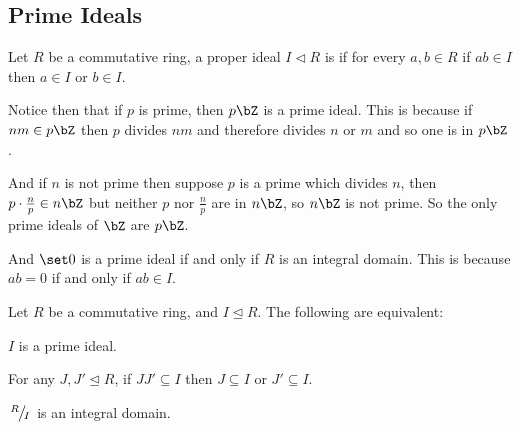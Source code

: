 \documentclass[10pt]{article}
\let\ideal=\trianglelefteq
\let\pideal=\triangleleft
\begin{document}


\bigskip

\subsection{Prime Ideals}

\begin{defn*}

    Let $R$ be a commutative ring, a proper ideal $I\pideal R$ is  if for every $a,b\in R$ if $ab\in I$ then $a\in I$ or $b\in I$.

\end{defn*}

\begin{exam*}

    \benum
        \item Notice then that if $p$ is prime, then $p\bZ$ is a prime ideal.
        This is because if $nm\in p\bZ$ then $p$ divides $nm$ and therefore divides $n$ or $m$ and so one is in $p\bZ$.

        And if $n$ is not prime then suppose $p$ is a prime which divides $n$, then $p\cdot\frac np\in n\bZ$ but neither $p$ nor $\frac np$ are in $n\bZ$, so $n\bZ$ is not prime.
        So the only prime ideals of $\bZ$ are $p\bZ$.

        \item And $\set 0$ is a prime ideal if and only if $R$ is an integral domain.
        This is because $ab=0$ if and only if $ab\in I$.
    \eenum

\end{exam*}

\begin{prop*}

    Let $R$ be a commutative ring, and $I\ideal R$.
    The following are equivalent:
    \benum
        \item $I$ is a prime ideal.
        \item For any $J,J'\ideal R$, if $JJ'\subseteq I$ then $J\subseteq I$ or $J'\subseteq I$.
        \item $\slfrac RI$ is an integral domain.
    \eenum

\end{prop*}
\end{document}
